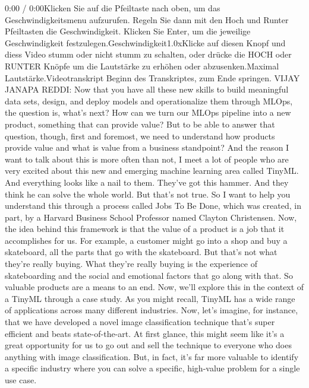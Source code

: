 {{{{{{{{    0:00 / 0:00Klicken Sie auf die Pfeiltaste nach oben, um das Geschwindigkeitsmenu aufzurufen. Regeln Sie dann mit den Hoch und Runter Pfeiltasten die Geschwindigkeit. Klicken Sie Enter, um die jeweilige Geschwindigkeit festzulegen.Geschwindigkeit1.0xKlicke auf diesen Knopf und diess Video stumm oder nicht stumm zu schalten, oder drücke die HOCH oder RUNTER Knöpfe um die Lautstärke zu erhöhen oder abzusenken.Maximal Lautstärke.Videotranskript
    Beginn des Transkriptes, zum Ende springen.
    VIJAY JANAPA REDDI: Now that you have all these new skills
    to build meaningful data sets, design, and deploy models
    and operationalize them through MLOps, the question is, what's next?
    How can we turn our MLOps pipeline into a new product,
    something that can provide value?
    But to be able to answer that question, though, first and foremost,
    we need to understand how products provide value
    and what is value from a business standpoint?
    And the reason I want to talk about this is more often than not,
    I meet a lot of people who are very excited about this new and emerging
    machine learning area called TinyML.
    And everything looks like a nail to them.
    They've got this hammer.
    And they think he can solve the whole world.
    But that's not true.
    So I want to help you understand this through a process called
    Jobs To Be Done, which was created, in part, by a Harvard Business School
    Professor named Clayton Christensen.
    Now, the idea behind this framework is that the value of a product
    is a job that it accomplishes for us.
    For example, a customer might go into a shop
    and buy a skateboard, all the parts that go with the skateboard.
    But that's not what they're really buying.
    What they're really buying is the experience of skateboarding
    and the social and emotional factors that go along with that.
    So valuable products are a means to an end.
    Now, we'll explore this in the context of a TinyML through a case study.
    As you might recall, TinyML has a wide range
    of applications across many different industries.
    Now, let's imagine, for instance, that we have developed a novel image
    classification technique that's super efficient and beats state-of-the-art.
    At first glance, this might seem like it's a great opportunity for us
    to go out and sell the technique to everyone who does anything
    with image classification.
    But, in fact, it's far more valuable to identify a specific industry
    where you can solve a specific, high-value problem for a single use
    case.
}}}}}}}}
